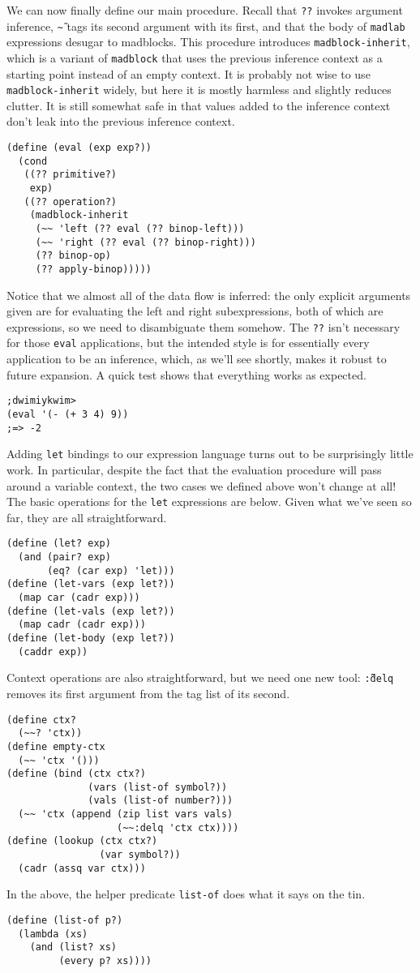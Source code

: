 \documentclass[11pt]{article}
\begin{document}
We can now finally define our main procedure.
Recall that \texttt{??} invokes argument inference,
\texttt{\~\~} tags its second argument with its first,
and that the body of \texttt{madlab} expressions
desugar to madblocks.
This procedure introduces \texttt{madblock-inherit},
which is a variant of \texttt{madblock} that
uses the previous inference context as a starting point
instead of an empty context.
It is probably not wise to use \texttt{madblock-inherit} widely,
but here it is mostly harmless and slightly reduces clutter.
It is still somewhat safe in that values added to the inference context
don't leak into the previous inference context.
\begin{Verbatim}
(define (eval (exp exp?))
  (cond
   ((?? primitive?)
    exp)
   ((?? operation?)
    (madblock-inherit
     (~~ 'left (?? eval (?? binop-left)))
     (~~ 'right (?? eval (?? binop-right)))
     (?? binop-op)
     (?? apply-binop)))))
\end{Verbatim}
Notice that we almost all of the data flow is inferred:
the only explicit arguments given are for evaluating
the left and right subexpressions,
both of which are expressions, so we need to disambiguate them somehow.
The \texttt{??} isn't necessary for those \texttt{eval} applications,
but the intended style is for essentially every application
to be an inference,
which, as we'll see shortly, makes it robust to future expansion.
A quick test shows that everything works as expected.
\begin{Verbatim}
;dwimiykwim>
(eval '(- (+ 3 4) 9))
;=> -2
\end{Verbatim}

Adding \texttt{let} bindings to our expression language
turns out to be surprisingly little work.
In particular,
despite the fact that the evaluation procedure
will pass around a variable context,
the two cases we defined above won't change at all!
The basic operations for the \texttt{let} expressions are below.
Given what we've seen so far, they are all straightforward.
\begin{Verbatim}
(define (let? exp)
  (and (pair? exp)
       (eq? (car exp) 'let)))
(define (let-vars (exp let?))
  (map car (cadr exp)))
(define (let-vals (exp let?))
  (map cadr (cadr exp)))
(define (let-body (exp let?))
  (caddr exp))
\end{Verbatim}
Context operations are also straightforward, but we need one new tool:
\texttt{\~\~:delq} removes its first argument from the tag list of its second.
\begin{Verbatim}
(define ctx?
  (~~? 'ctx))
(define empty-ctx
  (~~ 'ctx '()))
(define (bind (ctx ctx?)
              (vars (list-of symbol?))
              (vals (list-of number?)))
  (~~ 'ctx (append (zip list vars vals)
                   (~~:delq 'ctx ctx))))
(define (lookup (ctx ctx?)
                (var symbol?))
  (cadr (assq var ctx)))
\end{Verbatim}
In the above, the helper predicate \texttt{list-of}
does what it says on the tin.
\begin{Verbatim}
(define (list-of p?)
  (lambda (xs)
    (and (list? xs)
         (every p? xs))))
\end{Verbatim}
\end{document}
